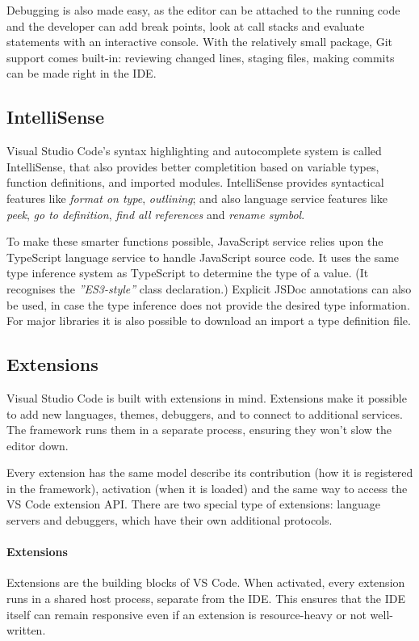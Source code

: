 Debugging is also made easy, as the editor can be attached to the running code and the developer can add break points, look at call stacks and evaluate statements with an interactive console. With the relatively small package, Git support comes built-in: reviewing changed lines, staging files, making commits can be made right in the IDE.

\subsection{IntelliSense}
Visual Studio Code's syntax highlighting and autocomplete system is called IntelliSense, that also provides better completition based on variable types, function definitions, and imported modules. IntelliSense provides syntactical features like \emph{format on type}, \emph{outlining}; and also language service features like \emph{peek}, \emph{go to definition}, \emph{find all references} and \emph{rename symbol}.

To make these smarter functions possible, JavaScript service relies upon the TypeScript language service to handle JavaScript source code. It uses the same type inference system as TypeScript to determine the type of a value. (It recognises the \emph{''ES3-style''} class declaration.) Explicit JSDoc annotations can also be used, in case the type inference does not provide the desired type information. For major libraries it is also possible to download an import a type definition file.

\subsection{Extensions}
Visual Studio Code is built with extensions in mind. Extensions make it possible to add new languages, themes, debuggers, and to connect to additional services. The framework runs them in a separate process, ensuring they won't slow the editor down.

Every extension has the same model describe its contribution (how it is registered in the framework), activation (when it is loaded) and the same way to access the VS Code extension API. There are two special type of extensions: language servers and debuggers, which have their own additional protocols.

\paragraph{Extensions} Extensions are the building blocks of VS Code. When activated, every extension runs in a shared host process, separate from the IDE. This ensures that the IDE itself can remain responsive even if an extension is resource-heavy or not well-written.

